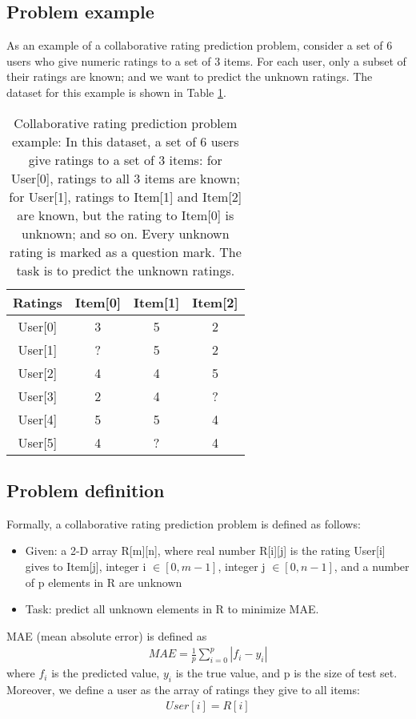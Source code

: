 \documentclass[sigconf]{acmart}
\begin{document}
\subsection{Problem example}
As an example of a collaborative rating prediction problem, consider 
a set of 6 users who give numeric ratings to a set of 3 items.
For each user, only a subset of their ratings are known; 
and we want to predict the unknown ratings.
The dataset for this example is shown in Table \ref{tab:ratings}.
\begin{table}[!htb]
	\centering
	\caption{Collaborative rating prediction problem example:
		In this dataset, a set of 6 users give ratings to a set of 3 items: 
		for User[0], ratings to all 3 items are known; 
		for User[1], ratings to Item[1] and Item[2] are known, 
		but the rating to Item[0] is unknown; and so on.
		Every unknown rating is marked as a question mark.
		The task is to predict the unknown ratings.
	}
	\begin{tabular}{cccc} \hline
		Ratings & Item[0] & Item[1] & Item[2] \\ \hline
		User[0] & 3       & 5       & 2 \\ \hline
		User[1] & ?       & 5       & 2 \\ \hline
		User[2] & 4       & 4       & 5 \\ \hline
		User[3] & 2       & 4       & ? \\ \hline
		User[4] & 5       & 5       & 4 \\ \hline
		User[5] & 4       & ?       & 4 \\ \hline
	\end{tabular}
	\label{tab:ratings}
\end{table}

\subsection{Problem definition}
Formally, a collaborative rating prediction problem is defined as follows:
\begin{itemize}
	\item Given: a 2-D array R[m][n], 
	where real number R[i][j] is the rating User[i] gives to Item[j],
	integer i $ \in [0, m-1] $, integer j $ \in [0, n-1] $, and a number of 
	p elements in R are unknown
	\item Task: predict all unknown elements in R to minimize MAE.
\end{itemize}
MAE (mean absolute error) is defined as
\begin{align*}
	MAE = \frac{1}{p} \sum_{i = 0}^{p}|f_i - y_i|
\end{align*}
where $ f_i $ is the predicted value, $ y_i $ is the true value, and p is the 
size of test set.
Moreover, we define a user as the array of ratings they give to all items: 
\begin{align*}
	User[i] = R[i]
\end{align*}
\end{document}
